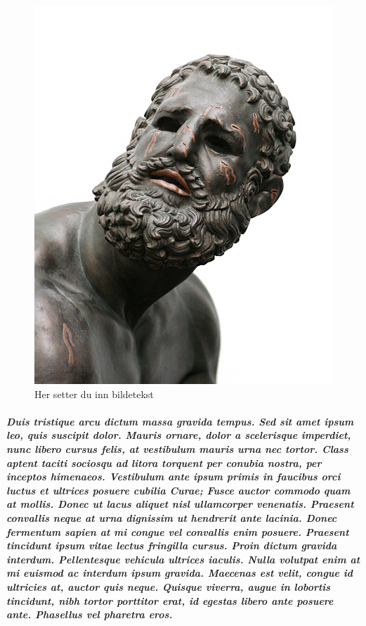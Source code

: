\documentclass[titlepage,norsk]{article}
\begin{document}
\begin{figure}[p]
\centering
\includegraphics[scale=0.10]{pic.jpg}
\caption{Her setter du inn bildetekst}
\label{fig:awesome_image}
\end{figure}


\subparagraph{
Duis tristique arcu dictum massa gravida tempus. Sed sit amet ipsum leo, quis suscipit dolor. Mauris ornare, dolor a scelerisque imperdiet, nunc libero cursus felis, at vestibulum mauris urna nec tortor. Class aptent taciti sociosqu ad litora torquent per conubia nostra, per inceptos himenaeos. Vestibulum ante ipsum primis in faucibus orci luctus et ultrices posuere cubilia Curae; Fusce auctor commodo quam at mollis. Donec ut lacus aliquet nisl ullamcorper venenatis. Praesent convallis neque at urna dignissim ut hendrerit ante lacinia. Donec fermentum sapien at mi congue vel convallis enim posuere. Praesent tincidunt ipsum vitae lectus fringilla cursus. Proin dictum gravida interdum. Pellentesque vehicula ultrices iaculis. Nulla volutpat enim at mi euismod ac interdum ipsum gravida. Maecenas est velit, congue id ultricies at, auctor quis neque. Quisque viverra, augue in lobortis tincidunt, nibh tortor porttitor erat, id egestas libero ante posuere ante. Phasellus vel pharetra eros.
}

\appendices
\end{document}
